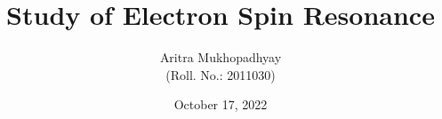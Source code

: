 \documentclass[10pt]{article}
\title{\textbf{Study of Electron Spin Resonance}}
\author{Aritra Mukhopadhyay\\(Roll. No.: 2011030)}
\date{October 17, 2022}
\begin{document}
    \maketitle
    
    \begin{multicols*}{2}
        
        
        
        
        

        
        
        \nocite{*}
    \end{multicols*}
\end{document}
